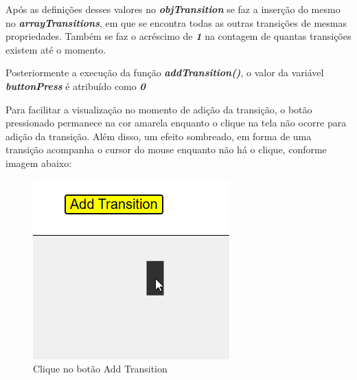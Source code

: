 \documentclass[
	12pt,				%
	openright,			%
	oneside,			%
	a4paper,			%
	english,			%
	brazil				%
	]{abntex2}
\begin{document}
Após as definições desses valores no \textbf{\textit{objTransition}} se faz a inserção do mesmo no \textbf{\textit{arrayTransitions}}, em que se encontra todas as outras transições de mesmas propriedades. Também se faz o acréscimo de \textbf{\textit{1}} na contagem de quantas transições existem até o momento.



Posteriormente a execução da função \textbf{\textit{addTransition()}}, o valor da variável \textbf{\textit{buttonPress}} é atribuído como \textbf{\textit{0}}

Para facilitar a visualização no momento de adição da transição, o botão pressionado permanece na cor amarela enquanto o clique na tela não ocorre para adição da transição. Além disso, um efeito sombreado, em forma de uma transição acompanha o cursor do mouse enquanto não há o clique, conforme imagem abaixo: 

\begin{figure}[ht] 
	\centering
	\includegraphics[scale=0.55]{figuras/exemplo_clique_addTransition.png}
	\caption[Clicando bo botao addTransition]{Clique no botão Add Transition}
	\label{fig:clique_add_transition}
\end{figure}


\newpage
\end{document}
